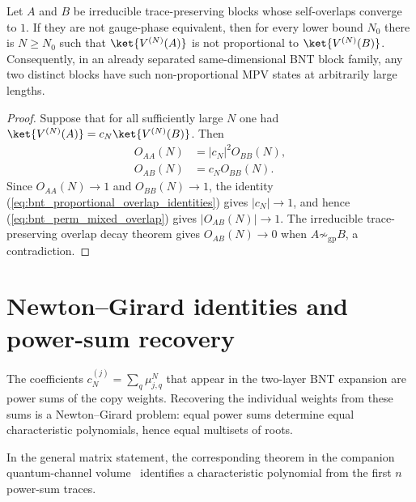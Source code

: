 \begin{lemma}
    \label{thm:not_gauge_phase_eventually_not_proportional}
    \leanok
    Let $A$ and $B$ be irreducible trace-preserving blocks whose
    self-overlaps converge to $1$. If they are not gauge-phase equivalent,
    then for every lower bound $N_0$ there is $N \ge N_0$ such that
    $\ket{V^{(N)}(A)}$ is not proportional to $\ket{V^{(N)}(B)}$.
    Consequently, in an already separated same-dimensional BNT block family,
    any two distinct blocks have such non-proportional MPV states at
    arbitrarily large lengths.
\end{lemma}

\begin{proof}\leanok
    Suppose that for all sufficiently large $N$ one had
    $\ket{V^{(N)}(A)}=c_N\ket{V^{(N)}(B)}$. Then
    \begin{align}
        O_{AA}(N) & = |c_N|^2O_{BB}(N),
        \label{eq:bnt_proportional_overlap_identities} \\
        O_{AB}(N) & = c_NO_{BB}(N).
        \label{eq:bnt_perm_mixed_overlap}
    \end{align}
    Since $O_{AA}(N)\to1$ and $O_{BB}(N)\to1$, the identity
    (\ref{eq:bnt_proportional_overlap_identities}) gives $|c_N|\to1$, and hence
    (\ref{eq:bnt_perm_mixed_overlap}) gives $|O_{AB}(N)|\to1$. The irreducible
    trace-preserving overlap decay theorem gives $O_{AB}(N)\to0$ when
    $A\not\sim_{\mathrm{gp}}B$, a contradiction.
\end{proof}

\section{Newton--Girard identities and power-sum recovery}

The coefficients $c_N^{(j)} = \sum_q \mu_{j,q}^N$ that appear in the
two-layer BNT expansion are power sums of the copy weights. Recovering the
individual weights from these sums is a Newton--Girard problem: equal power sums
determine equal characteristic polynomials, hence equal multisets of roots.

In the general matrix statement,
the corresponding theorem in the companion quantum-channel volume~\cite[``Newton--Girard trace recursion'']{QICLean2026Blueprint} identifies a characteristic polynomial
from the first $n$ power-sum traces.

